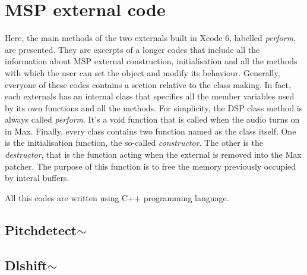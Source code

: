 
\chapter{MSP external code} %

\label{AppendixB} %


Here, the main methods of the two externals built in Xcode 6, labelled \emph{perform}, are presented.
They are excerpts of a longer codes that include all the information about MSP external construction, initialisation and all the methods with which the user can set the object and modify its behaviour. 
\newline
Generally, everyone of these codes contains a section relative to the class making. In fact, each externals has an internal class that specifies all the member variables used by its own functions and all the methods. For simplicity, the DSP class method is always called \emph{perform}. It's a void function that is called when the audio turns on in Max. 
\newline
Finally, every class contains two function named as the class itself. One is the initialisation function, the so-called \emph{constructor}. The other is the \emph{destructor}, that is the function acting when the external is removed into the Max patcher. The purpose of this function is to free the memory previously occupied by interal buffers. 

All this codes are written using C++ programming language.
\newline
\newline
\newline
\section{Pitchdetect$\sim$}
\label{pitchcode}

\section{Dlshift$\sim$}
\label{shiftcode}

